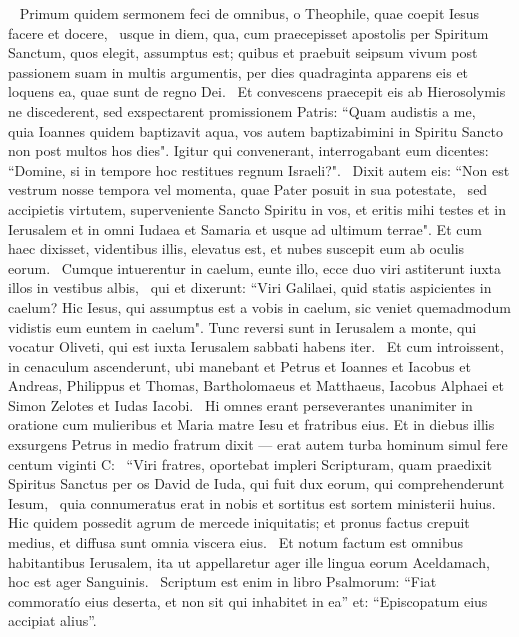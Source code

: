 
\begin{biblechapter}   
\verse Primum quidem sermonem feci de omnibus, o Theophile, quae coepit Iesus facere et docere,  
\verse usque in diem, qua, cum praecepisset apostolis per Spiritum Sanctum, quos elegit, assumptus est;
\verse quibus et praebuit seipsum vivum post passionem suam in multis argumentis, per dies quadraginta apparens eis et loquens ea, quae sunt de regno Dei.  
\verse Et convescens praecepit eis ab Hierosolymis ne discederent, sed exspectarent promissionem Patris: “Quam audistis a me,  
\verse quia Ioannes quidem baptizavit aqua, vos autem baptizabimini in Spiritu Sancto non post multos hos dies". 
\verse Igitur qui convenerant, interrogabant eum dicentes: “Domine, si in tempore hoc restitues regnum Israeli?".  
\verse Dixit autem eis: “Non est vestrum nosse tempora vel momenta, quae Pater posuit in sua potestate,  
\verse sed accipietis virtutem, superveniente Sancto Spiritu in vos, et eritis mihi testes et in Ierusalem et in omni Iudaea et Samaria et usque ad ultimum terrae". 
\verse Et cum haec dixisset, videntibus illis, elevatus est, et nubes suscepit eum ab oculis eorum.  
\verse Cumque intuerentur in caelum, eunte illo, ecce duo viri astiterunt iuxta illos in vestibus albis,  
\verse qui et dixerunt: “Viri Galilaei, quid statis aspicientes in caelum? Hic Iesus, qui assumptus est a vobis in caelum, sic veniet quemadmodum vidistis eum euntem in caelum". 
\verse Tunc reversi sunt in Ierusalem a monte, qui vocatur Oliveti, qui est iuxta Ierusalem sabbati habens iter.  
\verse Et cum introissent, in cenaculum ascenderunt, ubi manebant et Petrus et Ioannes et Iacobus et Andreas, Philippus et Thomas, Bartholomaeus et Matthaeus, Iacobus Alphaei et Simon Zelotes et Iudas Iacobi.  
\verse Hi omnes erant perseverantes unanimiter in oratione cum mulieribus et Maria matre Iesu et fratribus eius. 
\verse Et in diebus illis exsurgens Petrus in medio fratrum dixit — erat autem turba hominum simul fere centum viginti C:  
\verse “Viri fratres, oportebat impleri Scripturam, quam praedixit Spiritus Sanctus per os David de Iuda, qui fuit dux eorum, qui comprehenderunt Iesum,  
\verse quia connumeratus erat in nobis et sortitus est sortem ministerii huius.  
\verse Hic quidem possedit agrum de mercede iniquitatis; et pronus factus crepuit medius, et diffusa sunt omnia viscera eius.  
\verse Et notum factum est omnibus habitantibus Ierusalem, ita ut appellaretur ager ille lingua eorum Aceldamach, hoc est ager Sanguinis.  
\verse Scriptum est enim in libro Psalmorum: “Fiat commoratío eius deserta, et non sit qui inhabitet in ea” et: “Episcopatum eius accipiat alius”. 

\end{biblechapter}
